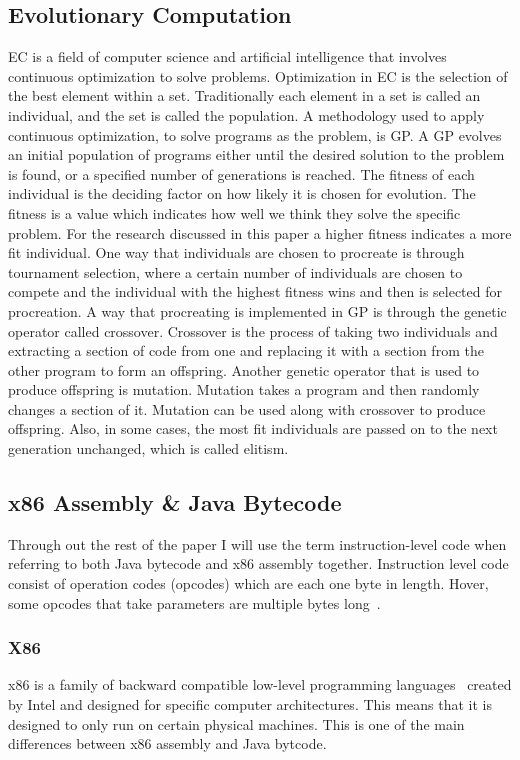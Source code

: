 \documentclass{sig-alternate}
\begin{document}
\subsection{Evolutionary Computation}

EC is a field of computer science and artificial intelligence that involves continuous optimization to solve problems. Optimization in EC is the selection of the best element within a set. Traditionally each element in a set is called an individual, and the set is called the population. A methodology used to apply continuous optimization, to solve programs as the problem, is GP. A GP evolves an initial population of programs either until the desired solution to the problem is found, or a specified number of generations is reached. The fitness of each individual is the deciding factor on how likely it is chosen for evolution. The fitness is a value which indicates how well we think they solve the specific problem. For the research discussed in this paper a higher fitness indicates a more fit individual. One way that individuals are chosen to procreate is through tournament selection, where a certain number of individuals are chosen to compete and the individual with the highest fitness wins and then is selected for procreation. A way that procreating is implemented in GP is through the genetic operator called crossover. Crossover is the process of taking two individuals and extracting a section of code from one and replacing it with a section from the other program to form an offspring. Another genetic operator that is used to produce offspring is mutation. Mutation takes a program and then randomly changes a section of it. Mutation can be used along with crossover to produce offspring. Also, in some cases, the most fit individuals are passed on to the next generation unchanged, which is called elitism.


\subsection{x86 Assembly \& Java Bytecode}


Through out the rest of the paper I will use the term instruction-level code when referring to both Java bytecode and x86 assembly together. Instruction level code consist of operation codes (opcodes) which are each one byte in length. Hover, some opcodes that take parameters are multiple bytes long~\cite{JavaBytecode:2014,x86tomachine:2013}.

\subsubsection{X86}
x86 is a family of backward compatible low-level programming languages~\cite{x86assembly:2014} created by Intel and designed for specific computer architectures. This means that it is designed to only run on certain physical machines. This is one of the main differences between x86 assembly and Java bytcode. 
\end{document}
